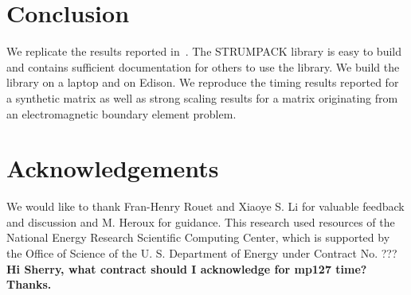 \documentclass{acmsmall}
\newcommand{\dmcomment}[1]{\textbf{#1}}
\begin{document}
\section{Conclusion}

We replicate the results reported in~\cite{rouet:strumpack}.  The
STRUMPACK library is easy to build and contains sufficient
documentation for others to use the library.  We build the
library on a laptop and on Edison.  We reproduce the timing
results reported for a synthetic matrix as well as strong scaling
results for a matrix originating from an electromagnetic boundary
element problem.


\section{Acknowledgements}

We would like to thank Fran\cois-Henry Rouet and Xiaoye S. Li for
valuable feedback and discussion and M. Heroux for guidance.
This research used resources of the National Energy Research
Scientific Computing Center, which is supported by the Office of
Science of the U. S. Department of Energy under Contract No. ???
\dmcomment{Hi Sherry, what contract should I acknowledge for
mp127 time? Thanks.}



\end{document}
